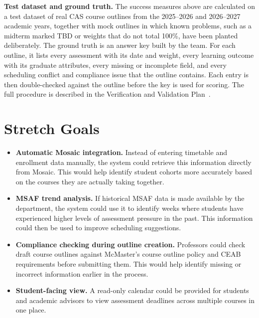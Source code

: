 \documentclass{article}
\begin{document}
\bigskip
\noindent\textbf{Test dataset and ground truth.} The success measures above
are calculated on a test dataset of real CAS course outlines from the 2025--2026
and 2026--2027 academic years, together with mock outlines in which known
problems, such as a midterm marked TBD or weights that do not total 100\%, have
been planted deliberately. The ground truth is an answer key built by the team.
For each outline, it lists every assessment with its date and weight, every
learning outcome with its graduate attributes, every missing or incomplete
field, and every scheduling conflict and compliance issue that the outline
contains. Each entry is then double-checked against the outline before the key
is used for scoring. The full procedure is described in the Verification and
Validation Plan~\citep{TeamBVSH2026VnVP}.

\section{Stretch Goals}


\begin{itemize}
\item \textbf{Automatic Mosaic integration.} Instead of entering timetable and enrollment data manually, the system could retrieve this information directly from Mosaic. This would help identify student cohorts more accurately based on the courses they are actually taking together.

\item \textbf{MSAF trend analysis.} If historical MSAF data is made available by the department, the system could use it to identify weeks where students have experienced higher levels of assessment pressure in the past. This information could then be used to improve scheduling suggestions.

\item \textbf{Compliance checking during outline creation.} Professors could check draft course outlines against McMaster's course outline policy and CEAB requirements before submitting them. This would help identify missing or incorrect information earlier in the process.

\item \textbf{Student-facing view.} A read-only calendar could be provided for students and academic advisors to view assessment deadlines across multiple courses in one place.
\end{itemize}
\end{document}
